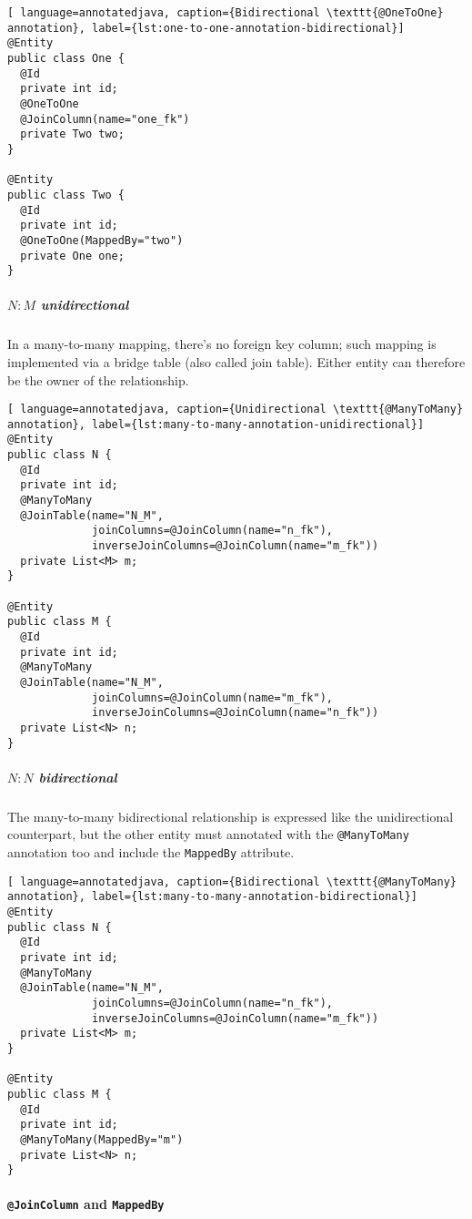 \documentclass[english]{article}
\begin{document}
\begin{lstlisting}[ language=annotatedjava, caption={Bidirectional \texttt{@OneToOne} annotation}, label={lst:one-to-one-annotation-bidirectional}]
@Entity
public class One {
  @Id
  private int id;
  @OneToOne
  @JoinColumn(name="one_fk")
  private Two two;
}

@Entity
public class Two {
  @Id
  private int id;
  @OneToOne(MappedBy="two")
  private One one;
}
\end{lstlisting}

\subparagraph*{\(N:M\) unidirectional}
In a many-to-many mapping, there's no foreign key column; such mapping is implemented via a bridge table (also called join table).
Either entity can therefore be the owner of the relationship.

\begin{lstlisting}[ language=annotatedjava, caption={Unidirectional \texttt{@ManyToMany} annotation}, label={lst:many-to-many-annotation-unidirectional}]
@Entity
public class N {
  @Id
  private int id;
  @ManyToMany
  @JoinTable(name="N_M",
             joinColumns=@JoinColumn(name="n_fk"),
             inverseJoinColumns=@JoinColumn(name="m_fk"))
  private List<M> m;
}

@Entity
public class M {
  @Id
  private int id;
  @ManyToMany
  @JoinTable(name="N_M",
             joinColumns=@JoinColumn(name="m_fk"),
             inverseJoinColumns=@JoinColumn(name="n_fk"))
  private List<N> n;
}
\end{lstlisting}

\subparagraph*{\(N:N\) bidirectional}
The many-to-many bidirectional relationship is expressed like the unidirectional counterpart, but the other entity must annotated with the \texttt{@ManyToMany} annotation too and include the \texttt{MappedBy} attribute.

\begin{lstlisting}[ language=annotatedjava, caption={Bidirectional \texttt{@ManyToMany} annotation}, label={lst:many-to-many-annotation-bidirectional}]
@Entity
public class N {
  @Id
  private int id;
  @ManyToMany
  @JoinTable(name="N_M",
             joinColumns=@JoinColumn(name="n_fk"),
             inverseJoinColumns=@JoinColumn(name="m_fk"))
  private List<M> m;
}

@Entity
public class M {
  @Id
  private int id;
  @ManyToMany(MappedBy="m")
  private List<N> n;
}
\end{lstlisting}

\paragraph{\texttt{@JoinColumn} and \texttt{MappedBy}}
\end{document}
